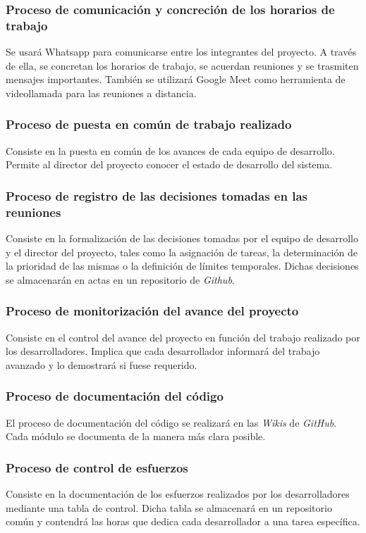 \documentclass{article}
\begin{document}
\subsubsection{Proceso de comunicación y concreción de los horarios de trabajo} \label{P.EC.1}
Se usará Whatsapp para comunicarse entre los integrantes del proyecto. A través de ella, se concretan los horarios de trabajo, se acuerdan reuniones y se trasmiten mensajes importantes. También se utilizará Google Meet como herramienta de videollamada para las reuniones a distancia. 

\subsubsection{Proceso de puesta en común de trabajo realizado} \label{P.EC.2}
Consiste en la puesta en común de los avances de cada equipo de desarrollo. Permite al director del proyecto conocer el estado de desarrollo del sistema.

\subsubsection{Proceso de registro de las decisiones tomadas en las reuniones} \label{P.EC.3}
Consiste en la formalización de las decisiones tomadas por el equipo de desarrollo y el director del proyecto, tales como la asignación de tareas, la determinación de la prioridad de las mismas o la definición de límites temporales. Dichas decisiones se almacenarán en actas en un repositorio de \textit{Github}.

\subsubsection{Proceso de monitorización del avance del proyecto} \label{P.EC.4}
Consiste en el control del avance del proyecto en función del trabajo realizado por los desarrolladores. Implica que cada desarrollador informará del trabajo avanzado y lo demostrará si fuese requerido.

\subsubsection{Proceso de documentación del código} \label{P.EC.5}
El proceso de documentación del código se realizará en las \textit{Wikis} de \textit{GitHub}. Cada módulo se documenta de la manera más clara posible.

\subsubsection{Proceso de control de esfuerzos} \label{P.EC.6}
Consiste en la documentación de los esfuerzos realizados por los desarrolladores mediante una tabla de control. Dicha tabla se almacenará en un repositorio común y contendrá las horas que dedica cada desarrollador a una tarea específica.
\end{document}
